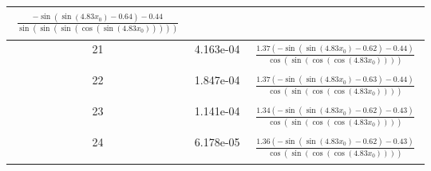 \begin{center}
\begin{tabular}{|c|c|c|}
$\begin{aligned}\frac{- \sin{\left(\sin{\left(4.83 x_{0} \right)} - 0.64 \right)} - 0.44}{\sin{\left(\sin{\left(\sin{\left(\cos{\left(\sin{\left(4.83 x_{0} \right)} \right)} \right)} \right)} \right)}}\end{aligned}$\\ \hline21 & 4.163e-04 & $\begin{aligned}\frac{1.37 \left(- \sin{\left(\sin{\left(4.83 x_{0} \right)} - 0.62 \right)} - 0.44\right)}{\cos{\left(\sin{\left(\cos{\left(\cos{\left(4.83 x_{0} \right)} \right)} \right)} \right)}}\end{aligned}$\\ \hline22 & 1.847e-04 & $\begin{aligned}\frac{1.37 \left(- \sin{\left(\sin{\left(4.83 x_{0} \right)} - 0.63 \right)} - 0.44\right)}{\cos{\left(\sin{\left(\cos{\left(\cos{\left(4.83 x_{0} \right)} \right)} \right)} \right)}}\end{aligned}$\\ \hline23 & 1.141e-04 & $\begin{aligned}\frac{1.34 \left(- \sin{\left(\sin{\left(4.83 x_{0} \right)} - 0.62 \right)} - 0.43\right)}{\cos{\left(\sin{\left(\cos{\left(\cos{\left(4.83 x_{0} \right)} \right)} \right)} \right)}}\end{aligned}$\\ \hline24 & 6.178e-05 & $\begin{aligned}\frac{1.36 \left(- \sin{\left(\sin{\left(4.83 x_{0} \right)} - 0.62 \right)} - 0.43\right)}{\cos{\left(\sin{\left(\cos{\left(\cos{\left(4.83 x_{0} \right)} \right)} \right)} \right)}}\end{aligned}$\\ \hline\end{tabular}
        \end{center}
        